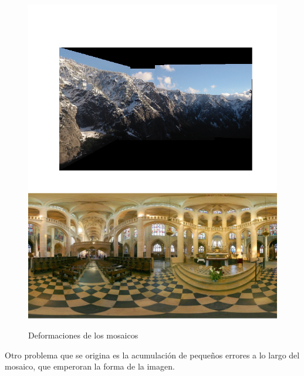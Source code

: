 \documentclass[11pt]{scrartcl} %
\begin{document}
\begin{figure}[h]
	\centering
	\includegraphics[width=0.7\columnwidth]{8c.png}
	\includegraphics[width=0.7\columnwidth]{4.png}
	\caption{Deformaciones de los mosaicos}
\end{figure}

Otro problema que se origina es la acumulación de pequeños errores a lo largo del mosaico, que
emperoran la forma de la imagen.
\end{document}
